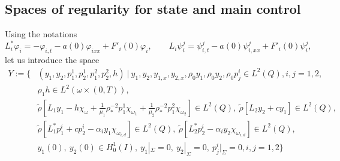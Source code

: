 \documentclass[11pt,a4paper]{amsart}
\numberwithin{equation}{section}
\begin{document}
\subsection{Spaces of regularity for state and main control}
Using the notations
$$
    \displaystyle L^{*}_{i}\varphi_{i}=-\varphi_{i,t}-a(0)\varphi_{ixx}+F'_{i}(0)\varphi_{i}, \qquad
	\displaystyle L_{i}\psi^{j}_{i}=\psi^{j}_{i,t}-a(0)\psi^{j}_{i,xx} +F'_{i}(0)\psi_{i}^j,
$$
let us introduce the space
\begin{equation*}
 	\begin{split}
 	Y:=\{&(y_1,y_2,p^1_1,p^1_2,p^2_1,p^2_2,h) \ | \ y_1,y_2, y_{1,x}, y_{2,x}, \rho_0y_1, \rho_0y_2, \rho_0p^i_j \in L^2(Q),i,j=1,2,\\
 	&\rho_1h \in L^2(\omega \times (0,T)), \\ %
 	&\tilde{\rho} [L_1 y_1  -h\chi_\omega +\frac{1}{\mu_1}\rho_*^{-2}p_1^1\chi_{\omega_1} +\frac{1}{\mu_2}\rho_*^{-2}p_1^2\chi_{\omega_2}] \in L^2(Q), \ \tilde{\rho}[L_2 y_2   +cy_1] \in L^2(Q),\\
 	&\tilde{\rho}[L_1^* p_1^i + cp_2^i -\alpha_i y_1 \chi_{\omega_{i,d}}] \in L^2(Q), \
 	\tilde{\rho}[L_2^* p_2^i  -\alpha_i y_2 \chi_{\omega_{i,d}}]  \in L^2(Q),\\
 	& y_1(0), \ y_2(0) \in  H^1_0(I), \ y_1 |_{\Sigma} = 0, \ y_2 |_{\Sigma} = 0, \ p_j^i |_{\Sigma} = 0, i,j=1,2  %
    \}
 	\end{split} 
\end{equation*}
\end{document}
